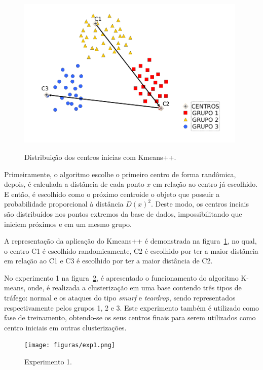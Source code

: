 \begin{figure}[!h]
\centering
\includegraphics[width = 11cm, height = 8cm]{figuras/kmeans++.png}
\caption{\scriptsize{Distribuição dos centros inicias com Kmeans++.}}
\label{fig2}
\end{figure}

\indent Primeiramente, o algoritmo escolhe o primeiro centro de forma randômica, depois, é calculada a distância de cada ponto $x$ em relação ao centro já escolhido. E então, é escolhido como o próximo centroide o objeto que possuir a probabilidade proporcional à distância $D(x)^{2}$. Deste modo, os centros inciais são distribuídos nos pontos extremos da base de dados, impossibilitando que iniciem próximos e em um mesmo grupo.

\indent A representação da aplicação do Kmeans++ é demonstrada na figura~\ref{fig2}, no qual, o centro C1 é escolhido randomicamente, C2 é escolhido por ter a maior distância em relação ao C1 e C3 é escolhido por ter a maior distância de C2.

\indent No experimento 1 na figura~\ref{fig3}, é apresentado o funcionamento do algoritmo K-means, onde,  é realizada a clusterização em uma base contendo três tipos de tráfego: normal e os ataques do tipo \textit{smurf} e \textit{teardrop}, sendo representados respectivamente pelos grupos 1, 2 e 3. Este experimento também é utilizado como fase de treinamento, obtendo-se os seus centros finais para serem utilizados como centro iniciais em outras clusterizações.
  
\begin{figure}[!h]
\centering
\texttt{[image: figuras/exp1.png]}
\caption{\scriptsize{Experimento 1.}}
\label{fig3}
\end{figure}

